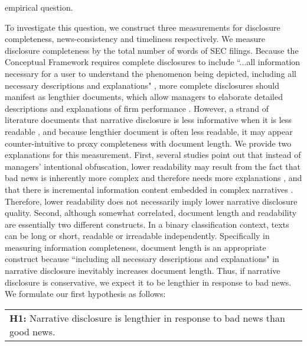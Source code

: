 \documentclass[a4paper]{article}
\begin{document}
\begin{spacing}{2}
empirical question.

To investigate this question, we construct three measurements for disclosure completeness, news-consistency and timeliness respectively. We measure disclosure completeness by the total number of words of SEC filings. Because the Conceptual Framework requires complete disclosures to include ``...all information necessary for a user to understand the phenomenon being depicted, including all necessary descriptions and explanations" \citep*[QC12]{fasbConceptualFrameworkFinancial2018}, more complete disclosures should manifest as lengthier documents, which allow managers to elaborate detailed descriptions and explanations of firm performance \citep{leuzDisclosureCostCapital2009}. However, a strand of literature documents that narrative disclosure is less informative when it is less readable \citep*{liAnnualReportReadability2008, loEarningsManagementAnnual2017, loughranMeasuringReadabilityFinancial2014}, and because lengthier document is often less readable, it may appear counter-intuitive to proxy completeness with document length. We provide two explanations for this measurement. First, several studies point out that instead of managers' intentional obfuscation, lower readability may result from the fact that bad news is inherently more complex and therefore needs more explanations \citep*{bloomfieldDiscussionAnnualReport2008}, and that there is incremental information content embedded in complex narratives \citep*{busheeLinguisticComplexityFirm2018}. Therefore, lower readability does not necessarily imply lower narrative disclosure quality. Second, although somewhat correlated, document length and readability are essentially two different constructs. In a binary classification context, texts can be long or short, readable or irreadable independently. Specifically in measuring information completeness, document length is an appropriate construct because ``including all necessary descriptions and explanations" \citep*[QC12]{fasbConceptualFrameworkFinancial2018} in narrative disclosure inevitably increases document length. Thus, if narrative disclosure is conservative, we expect it to be lengthier in response to bad news. We formulate our first hypothesis as follows:

\begin{center}
	\begin{tabular}{l}
		\textbf{H1:} Narrative disclosure is lengthier in response to bad news than good news.
	\end{tabular}
\end{center}


\end{spacing}
\end{document}
